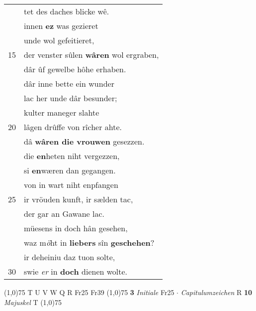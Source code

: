 \documentclass[8pt,a4paper,notitlepage]{article}
\begin{document}
\begin{table}[ht]
\begin{minipage}[t]{0.5\linewidth}
\begin{tabular}{rl}
 & tet des daches blicke wê.\\ 
 & innen \textbf{ez} was gezieret\\ 
 & unde wol gefeitieret,\\ 
15 & der venster sûlen \textbf{wâren} wol ergraben,\\ 
 & dâr ûf gewelbe hôhe erhaben.\\ 
 & dâr inne bette ein wunder\\ 
 & lac her unde dâr besunder;\\ 
 & kulter maneger slahte\\ 
20 & lâgen drûffe von rîcher ahte.\\ 
 & dâ \textbf{wâren die vrouwen} gesezzen.\\ 
 & die \textbf{en}heten niht vergezzen,\\ 
 & si \textbf{en}wæren dan gegangen.\\ 
 & von in wart niht enpfangen\\ 
25 & ir vröuden kunft, ir sælden tac,\\ 
 & der gar an Gawane lac.\\ 
 & müesens in doch hân gesehen,\\ 
 & waz m\textit{ö}ht in \textbf{liebers} sîn \textbf{geschehen}?\\ 
 & ir deheiniu daz tuon solte,\\ 
30 & swie \textit{er} in \textbf{doch} dienen wolte.\\ 
\end{tabular}
\scriptsize
\line(1,0){75} \newline
T U V W Q R Fr25 Fr39 \newline
\line(1,0){75} \newline
\textbf{3} \textit{Initiale} Fr25   $\cdot$ \textit{Capitulumzeichen} R  \textbf{10} \textit{Majuskel} T  \newline
\line(1,0){75} \newline

\end{minipage}
\end{table}
\end{document}
